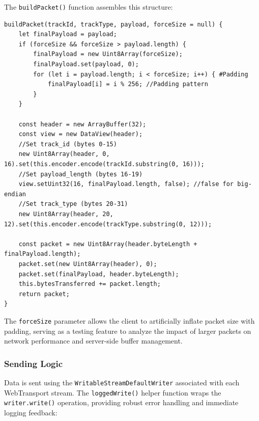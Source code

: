 The \texttt{buildPacket()} function assembles this structure:

\begin{lstlisting}[breaklines=true,basicstyle=\small\ttfamily,frame=single]
buildPacket(trackId, trackType, payload, forceSize = null) {
    let finalPayload = payload;
    if (forceSize && forceSize > payload.length) {
        finalPayload = new Uint8Array(forceSize);
        finalPayload.set(payload, 0);
        for (let i = payload.length; i < forceSize; i++) { #Padding
            finalPayload[i] = i % 256; //Padding pattern
        }
    }

    const header = new ArrayBuffer(32);
    const view = new DataView(header);
    //Set track_id (bytes 0-15)
    new Uint8Array(header, 0, 16).set(this.encoder.encode(trackId.substring(0, 16)));
    //Set payload_length (bytes 16-19)
    view.setUint32(16, finalPayload.length, false); //false for big-endian
    //Set track_type (bytes 20-31)
    new Uint8Array(header, 20, 12).set(this.encoder.encode(trackType.substring(0, 12)));

    const packet = new Uint8Array(header.byteLength + finalPayload.length);
    packet.set(new Uint8Array(header), 0);
    packet.set(finalPayload, header.byteLength);
    this.bytesTransferred += packet.length;
    return packet;
}
\end{lstlisting}

The \texttt{forceSize} parameter allows the client to artificially inflate packet size with padding, serving as a testing feature to analyze the impact of larger packets on network performance and server-side buffer management.

\subsubsection{Sending Logic}
Data is sent using the \texttt{WritableStreamDefaultWriter} associated with each WebTransport stream. The \texttt{loggedWrite()} helper function wraps the \texttt{writer.write()} operation, providing robust error handling and immediate logging feedback:

